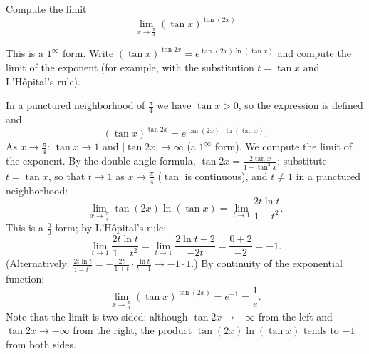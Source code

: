 
\begin{question}
Compute the limit
\[ \lim_{x\to\frac{\pi}{4}} (\tan x)^{\tan(2x)} \]
\end{question}

\begin{hint}
This is a $1^\infty$ form. Write $(\tan x)^{\tan 2x} = e^{\tan(2x)\ln(\tan x)}$ and compute the limit of the exponent (for example, with the substitution $t = \tan x$ and L'Hôpital's rule).
\end{hint}

\begin{solution}
In a punctured neighborhood of $\frac{\pi}{4}$ we have $\tan x > 0$, so the expression is defined and
\[ (\tan x)^{\tan 2x} = e^{\tan(2x)\cdot\ln(\tan x)}. \]
As $x \to \frac{\pi}{4}$: $\tan x \to 1$ and $|\tan 2x| \to \infty$ (a $1^\infty$ form). We compute the limit of the exponent. By the double-angle formula, $\tan 2x = \frac{2\tan x}{1 - \tan^2 x}$; substitute $t = \tan x$, so that $t \to 1$ as $x \to \frac{\pi}{4}$ ($\tan$ is continuous), and $t \ne 1$ in a punctured neighborhood:
\[ \lim_{x\to\frac{\pi}{4}} \tan(2x)\ln(\tan x) = \lim_{t\to1} \frac{2t\ln t}{1 - t^2}. \]
This is a $\frac00$ form; by L'Hôpital's rule:
\[ \lim_{t\to1} \frac{2t\ln t}{1 - t^2} = \lim_{t\to1} \frac{2\ln t + 2}{-2t} = \frac{0 + 2}{-2} = -1. \]
(Alternatively: $\frac{2t\ln t}{1 - t^2} = -\frac{2t}{1 + t}\cdot\frac{\ln t}{t - 1} \to -1\cdot 1$.)
By continuity of the exponential function:
\[ \boxed{\lim_{x\to\frac{\pi}{4}} (\tan x)^{\tan(2x)} = e^{-1} = \frac1e}. \]
Note that the limit is two-sided: although $\tan 2x \to +\infty$ from the left and $\tan 2x \to -\infty$ from the right, the product $\tan(2x)\ln(\tan x)$ tends to $-1$ from both sides.
\end{solution}
